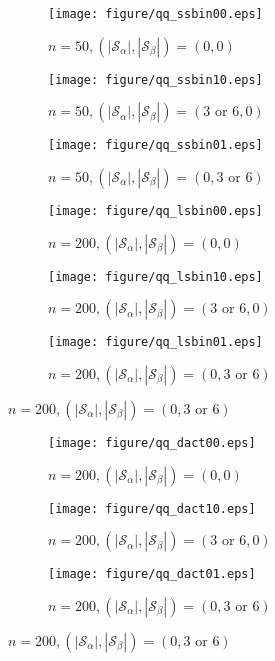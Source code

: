 \documentclass[a4paper]{article}
\begin{document}
\begin{figure}[!ht]
     \centering
     \begin{subfigure}{0.32\textwidth}
         \centering
         \caption*{$n=50, (|\mathcal{S}_\alpha|,|\mathcal{S}_\beta|)=(0,0)$}
         \texttt{[image: figure/qq\_ssbin00.eps]}
     \end{subfigure}
     \hfill
     \begin{subfigure}{0.32\textwidth}
         \centering
         \caption*{$n=50, (|\mathcal{S}_\alpha|,|\mathcal{S}_\beta|)=(3 \text{ or } 6,0)$}
         \texttt{[image: figure/qq\_ssbin10.eps]}
     \end{subfigure}
     \hfill
     \begin{subfigure}{0.32\textwidth}
         \centering
         \caption*{$n=50, (|\mathcal{S}_\alpha|,|\mathcal{S}_\beta|)=(0, 3 \text{ or } 6)$}
         \texttt{[image: figure/qq\_ssbin01.eps]}
     \end{subfigure}
     
     \begin{subfigure}{0.32\textwidth}
         \centering
         \caption*{$n=200, (|\mathcal{S}_\alpha|,|\mathcal{S}_\beta|)=(0,0)$}
         \texttt{[image: figure/qq\_lsbin00.eps]}
     \end{subfigure}
     \hfill
     \begin{subfigure}{0.32\textwidth}
         \centering
         \caption*{$n=200, (|\mathcal{S}_\alpha|,|\mathcal{S}_\beta|)=(3 \text{ or } 6,0)$}
         \texttt{[image: figure/qq\_lsbin10.eps]}
     \end{subfigure}
     \hfill
     \begin{subfigure}{0.32\textwidth}
         \centering
         \caption*{$n=200, (|\mathcal{S}_\alpha|,|\mathcal{S}_\beta|)=(0, 3 \text{ or } 6)$}
         \texttt{[image: figure/qq\_lsbin01.eps]}
     \end{subfigure}
\end{figure}
\thispagestyle{empty}
\newpage
\begin{figure}[!ht]
     \centering
     \begin{subfigure}{0.32\textwidth}
         \centering
         \caption*{$n=200, (|\mathcal{S}_\alpha|,|\mathcal{S}_\beta|)=(0,0)$}
         \texttt{[image: figure/qq\_dact00.eps]}
     \end{subfigure}
     \hfill
     \begin{subfigure}{0.32\textwidth}
         \centering
         \caption*{$n=200, (|\mathcal{S}_\alpha|,|\mathcal{S}_\beta|)=(3 \text{ or } 6,0)$}
         \texttt{[image: figure/qq\_dact10.eps]}
     \end{subfigure}
     \hfill
     \begin{subfigure}{0.32\textwidth}
         \centering
         \caption*{$n=200, (|\mathcal{S}_\alpha|,|\mathcal{S}_\beta|)=(0, 3 \text{ or } 6)$}
         \texttt{[image: figure/qq\_dact01.eps]}
     \end{subfigure}
\end{figure}
\end{document}

